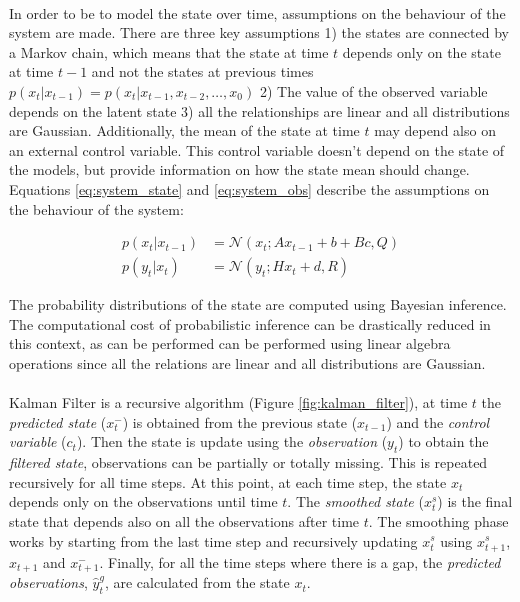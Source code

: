 \documentclass{article}
\newcommand{\norm}[3]{\mathcal{N}\left(#1; #2, #3\right)} %
\begin{document}
\paragraph{} In order to be to model the state over time, assumptions on the behaviour of the system are made. There are three key assumptions 1) the states are connected by a Markov chain, which means that the state at time $t$ depends only on the state at time $t-1$ and not the states at previous times $p(x_t|x_{t-1}) = p(x_t|x_{t-1}, x_{t-2}, \hdots, x_0)$ 2) The value of the observed variable depends on the latent state 3) all the relationships are linear and all distributions are Gaussian. Additionally, the mean of the state at time $t$ may depend also on an external control variable. This control variable doesn't depend on the state of the models, but provide information on how the state mean should change.
Equations \ref{eq:system_state} and \ref{eq:system_obs} describe the assumptions on the behaviour of the system:

\begin{align}
p(x_t | x_{t-1}) &= \norm{x_t}{Ax_{t-1} + b + Bc}{Q} \label{eq:system_state}\\
p(y_t | x_t) &= \norm{y_t}{Hx_t + d}{R} \label{eq:system_obs}
\end{align}

The probability distributions of the state are computed using Bayesian inference. The computational cost of probabilistic inference can be drastically reduced in this context, as can be performed can be performed using linear algebra operations since all the relations are linear and all distributions are Gaussian.

\paragraph{} Kalman Filter is a recursive algorithm (Figure \ref{fig:kalman_filter}), at time $t$ the \textit{predicted state} ($x^-_t$) is obtained from the previous state ($x_{t-1}$) and the \textit{control variable} ($c_t$). Then the state is update using the \textit{observation} ($y_t$) to obtain the \textit{filtered state}, observations can be partially or totally missing. This is repeated recursively for all time steps. At this point, at each time step, the state $x_t$ depends only on the observations until time $t$. The \textit{smoothed state} ($x^s_t$) is the final state that depends also on all the observations after time $t$. The smoothing phase works by starting from the last time step and recursively updating $x^s_t$ using $x^s_{t+1}$, $x_{t+1}$ and $x^-_{t+1}$.
Finally, for all the time steps where there is a gap, the \textit{predicted observations}, $\hat{y}^g_t$, are calculated from the state $x_t$.
\end{document}
